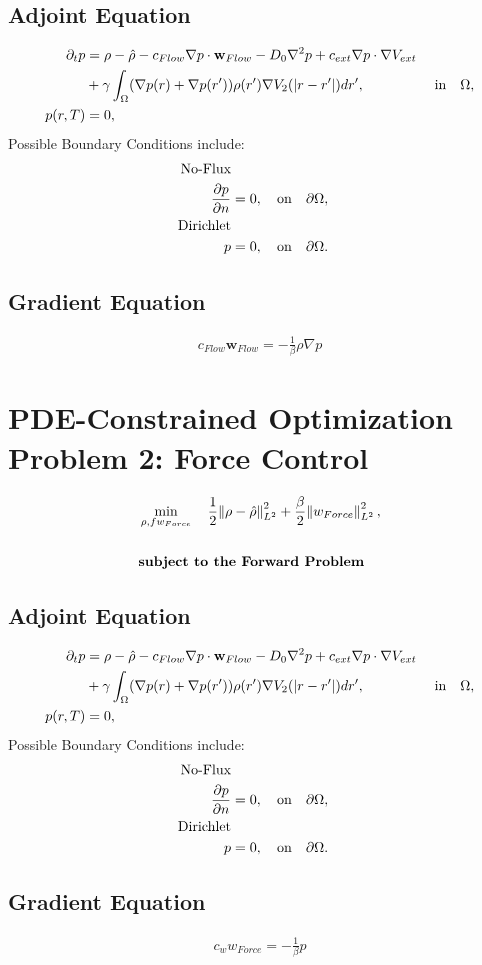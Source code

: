 \documentclass[11pt, a4paper]{article}
\theoremstyle{definition}
\begin{document}
\subsection*{Adjoint Equation}
\begin{align*}
\partial_t p &= \rho - \hat \rho - c_{Flow} \nabla p \cdot \mathbf w_{Flow} - D_0 \nabla^2 p + c_{ext} \nabla p \cdot \nabla V_{ext} \\
&+ \gamma\int_\Omega (\nabla  p(r)+\nabla  p(r')) \rho(r') \nabla V_2(|r-r'|) dr' , \qquad\qquad \quad \text{in} \quad  \Omega, \notag\\
p(r,T)&=0,\notag \\
\end{align*}
Possible Boundary Conditions include:
\begin{align*}
\text{No-Flux}  \notag\\
\frac{\partial p }{\partial n}&=0, \quad \text{on} \quad \partial \Omega, \notag\\
\text{Dirichlet}\\
p&=0, \quad \text{on} \quad \partial \Omega.
\end{align*}
\subsection*{Gradient Equation}
\begin{align*}
c_{Flow}\mathbf w_{Flow}=-\frac{1}{\beta}\rho \nabla p
\end{align*} 
\section*{PDE-Constrained Optimization Problem 2: Force Control}
\begin{align*}
&\min_{\rho,f{w}_{Force}} \quad \frac{1}{2}\norm{\rho- \hat{\rho}}_{L^2}^2 + \frac{\beta}{2} \norm{{w}_{Force}}_{L^2}^2,\\
\notag\\
&\textbf{subject to the Forward Problem}\notag
\end{align*}
\subsection*{Adjoint Equation}
\begin{align*}
\partial_t p &= \rho - \hat \rho - c_{Flow} \nabla p \cdot \mathbf w_{Flow} - D_0 \nabla^2 p + c_{ext} \nabla p \cdot \nabla V_{ext} \\
&+ \gamma\int_\Omega (\nabla  p(r)+\nabla  p(r')) \rho(r') \nabla V_2(|r-r'|) dr' ,  \qquad \qquad\quad \text{in} \quad  \Omega, \notag\\
p(r,T)&=0,\notag \\
\end{align*}
Possible Boundary Conditions include:
\begin{align*}
\text{No-Flux}  \notag\\
\frac{\partial p }{\partial n}&=0, \quad \text{on} \quad \partial \Omega, \notag\\
\text{Dirichlet}\\
p&=0, \quad \text{on} \quad \partial \Omega.
\end{align*}
\subsection*{Gradient Equation}
\begin{align*}
 c_{ w} w _{Force}=-\frac{1}{\beta}p
\end{align*} 
\end{document}
